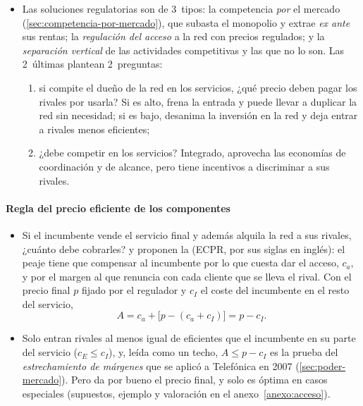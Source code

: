 \documentclass[11pt]{article}
\begin{document}
\begin{itemize}
\begin{enumerate}
  \item el \emph{precio de acceso} a la red, que decide cuánta competencia habrá en los tramos competitivos: la red es un cuello de botella, y su dueño, si compite aguas abajo, tiene incentivos a negar el acceso a sus rivales o a encarecerlo;
  \item mantener los incentivos a \emph{invertir} en la red y a mantenerla;
  \item garantizar el \emph{servicio universal}.
  \end{enumerate}
\item Las soluciones regulatorias son de 3~tipos: la competencia \emph{por} el mercado (\ref{sec:competencia-por-mercado}), que subasta el monopolio y extrae \emph{ex ante} sus rentas; la \emph{regulación del acceso} a la red con precios regulados; y la \emph{separación vertical} de las actividades competitivas y las que no lo son. Las 2~últimas plantean 2~preguntas:
  \begin{enumerate}
  \item si compite el dueño de la red en los servicios, ¿qué precio deben pagar los rivales por usarla? Si es alto, frena la entrada y puede llevar a duplicar la red sin necesidad; si es bajo, desanima la inversión en la red y deja entrar a rivales menos eficientes;
  \item ¿debe competir en los servicios? Integrado, aprovecha las economías de coordinación y de alcance, pero tiene incentivos a discriminar a sus rivales.
  \end{enumerate}
\end{itemize}

\paragraph{Regla del precio eficiente de los componentes}

\begin{itemize}
\item Si el incumbente vende el servicio final y además alquila la red a sus rivales, ¿cuánto debe cobrarles? \textcite{Willig1979Network} y \textcite{BaumolSidak1994Pricing} proponen la  (ECPR, por sus siglas en inglés): el peaje tiene que compensar al incumbente por lo que cuesta dar el acceso, $c_a$, y por el margen al que renuncia con cada cliente que se lleva el rival. Con el precio final $p$ fijado por el regulador y $c_I$ el coste del incumbente en el resto del servicio,
  \begin{equation}
  A=c_a+\big[p-(c_a+c_I)\big]=p-c_I. \label{eq:ecpr}
  \end{equation}
\item Solo entran rivales al menos igual de eficientes que el incumbente en su parte del servicio ($c_E\leq c_I$), y, leída como un techo, $A\leq p-c_I$ es la prueba del \emph{estrechamiento de márgenes} que se aplicó a Telefónica en 2007 (\ref{sec:poder-mercado}). Pero da por bueno el precio final, y solo es óptima en casos especiales\nocite{ArmstrongDoyleVickers1996Access} (supuestos, ejemplo y valoración en el anexo~\ref{anexo:acceso}).
\end{itemize}
\end{document}
